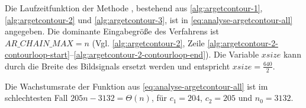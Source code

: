 Die Laufzeitfunktion der Methode , bestehend aus \autoref{alg:argetcontour-1},
 \autoref{alg:argetcontour-2} und \autoref{alg:argetcontour-3}, ist in \autoref{eq:analyse-argetcontour-all} angegeben.
 Die dominante Eingabegröße des Verfahrens ist $\mathit{AR\_CHAIN\_MAX} = n$ (Vgl. \autoref{alg:argetcontour-2},
 Zeile \ref{alg:argetcontour-2-contourloop-start}--\ref{alg:argetcontour-2-contourloop-end}). Die Variable
 $\mathit{xsize}$ kann durch die Breite des Bildsignals ersetzt werden und entspricht $\mathit{xsize} = \tfrac{640}{2}$.

Die Wachstumsrate der Funktion aus \autoref{eq:analyse-argetcontour-all} ist im schlechtesten Fall
 $205n - 3132 = \Theta(n)$, für $c_{1} = 204$, $c_{2} = 205$ und $n_{0} = 3132$.
